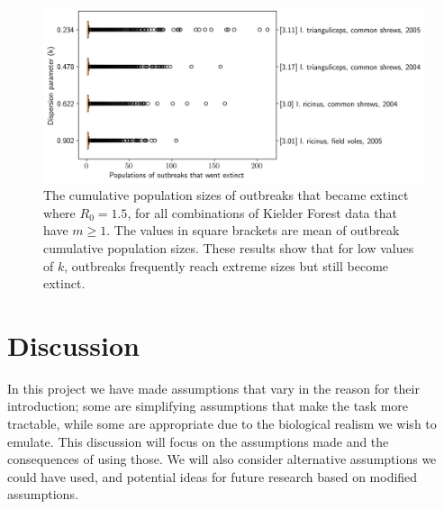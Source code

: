 \documentclass[hidelinks]{article}
\begin{document}
\begin{figure}[]
	\begin{mdframed}[backgroundcolor=grey250,rightline=false,leftline=false,topline=false]
		\centering
		\includegraphics[width=.73\linewidth,valign=m]{allCombinations_populationsOfOutbreaksThatWentExtinct}
		\caption{The cumulative population sizes of outbreaks that became extinct where $ R_0 = 1.5 $, for all combinations of Kielder Forest data that have $ m \ge 1 $. The values in square brackets are mean of outbreak cumulative population sizes. These results show that for low values of $ k $, outbreaks frequently reach extreme sizes but still become extinct.}
		\label{fig:allCombinations_populationsOfOutbreaksThatWentExtinct}
	\end{mdframed}
\end{figure}

\clearpage
\newpage

\section{Discussion}

In this project we have made assumptions that vary in the reason for their introduction; some are simplifying assumptions that make the task more tractable, while some are appropriate due to the biological realism we wish to emulate. This discussion will focus on the assumptions made and the consequences of using those. We will also consider alternative assumptions we could have used, and potential ideas for future research based on modified assumptions.
\end{document}

